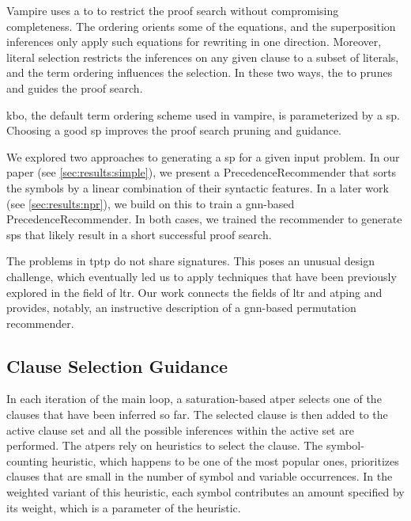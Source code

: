 Vampire uses a \gls{to} to restrict the proof search without compromising completeness.
The ordering orients some of the equations, and the superposition inferences only apply such equations for rewriting in one direction.
Moreover, literal selection restricts the inferences on any given clause to a subset of literals, and the term ordering influences the selection.
In these two ways, the \gls{to} prunes and guides the proof search.

\Gls{kbo}, the default term ordering scheme used in \gls{vampire}, is parameterized by a \gls{sp}.
Choosing a good \gls{sp} improves the proof search pruning and guidance.

We explored two approaches to generating a \gls{sp} for a given input problem.
In our paper \cite{} (see \cref{sec:results:simple}), we present a \gls{PrecedenceRecommender} that sorts the symbols by a linear combination of their syntactic features.
In a later work (see \cref{sec:results:npr}), we build on this to train a \acrshort{gnn}-based \gls{PrecedenceRecommender}.
In both cases, we trained the recommender to generate \glspl{sp} that likely result in a short successful proof search.

The problems in \gls{tptp} do not share signatures.
This poses an unusual design challenge,
which eventually led us to apply techniques that have been previously explored in the field of \gls{ltr}.
Our work connects the fields of \gls{ltr} and \gls{atping} and provides, notably, an instructive description of a \acrshort{gnn}-based permutation recommender.

\subsection{Clause Selection Guidance}
\label{sec:contrib:ClauseSelection}

In each iteration of the main loop,
a saturation-based \gls{atper} selects one of the clauses that have been inferred so far.
The selected clause is then added to the active clause set and all the possible inferences within the active set are performed.
The \glspl{atper} rely on heuristics to select the clause.
The symbol-counting heuristic, which happens to be one of the most popular ones,
prioritizes clauses that are small in the number of symbol and variable occurrences.
In the weighted variant of this heuristic,
each symbol contributes an amount specified by its weight,
which is a parameter of the heuristic.

